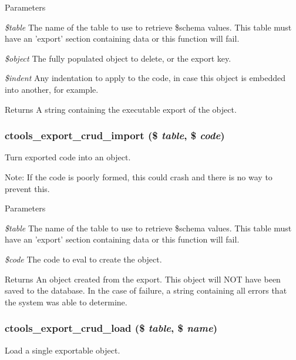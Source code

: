\begin{DoxyParams}{Parameters}
\item[{\em \$table}]The name of the table to use to retrieve \$schema values. This table must have an 'export' section containing data or this function will fail. \item[{\em \$object}]The fully populated object to delete, or the export key. \item[{\em \$indent}]Any indentation to apply to the code, in case this object is embedded into another, for example.\end{DoxyParams}
\begin{DoxyReturn}{Returns}
A string containing the executable export of the object. 
\end{DoxyReturn}
\hypertarget{group__export__crud_gacef0d6e3eee416774e6e08c497ed62bb}{
\subsubsection[{ctools\_\-export\_\-crud\_\-import}]{\setlength{\rightskip}{0pt plus 5cm}ctools\_\-export\_\-crud\_\-import (\$ {\em table}, \/  \$ {\em code})}}
\label{group__export__crud_gacef0d6e3eee416774e6e08c497ed62bb}
Turn exported code into an object.

Note: If the code is poorly formed, this could crash and there is no way to prevent this.


\begin{DoxyParams}{Parameters}
\item[{\em \$table}]The name of the table to use to retrieve \$schema values. This table must have an 'export' section containing data or this function will fail. \item[{\em \$code}]The code to eval to create the object.\end{DoxyParams}
\begin{DoxyReturn}{Returns}
An object created from the export. This object will NOT have been saved to the database. In the case of failure, a string containing all errors that the system was able to determine. 
\end{DoxyReturn}
\hypertarget{group__export__crud_gafdb2a891145f268c573653fe61c79fa3}{
\subsubsection[{ctools\_\-export\_\-crud\_\-load}]{\setlength{\rightskip}{0pt plus 5cm}ctools\_\-export\_\-crud\_\-load (\$ {\em table}, \/  \$ {\em name})}}
\label{group__export__crud_gafdb2a891145f268c573653fe61c79fa3}
Load a single exportable object.


